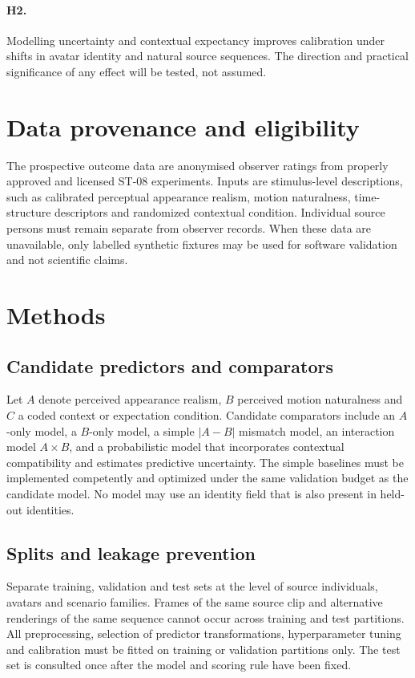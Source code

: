 \documentclass[11pt,a4paper]{article}
\begin{document}
\paragraph{H2.} Modelling uncertainty and contextual expectancy improves calibration under shifts in avatar identity and natural source sequences. The direction and practical significance of any effect will be tested, not assumed.
\section{Data provenance and eligibility}
The prospective outcome data are anonymised observer ratings from properly approved and licensed ST-08 experiments. Inputs are stimulus-level descriptions, such as calibrated perceptual appearance realism, motion naturalness, time-structure descriptors and randomized contextual condition. Individual source persons must remain separate from observer records. When these data are unavailable, only labelled synthetic fixtures may be used for software validation and not scientific claims.
\section{Methods}
\subsection{Candidate predictors and comparators}
Let $A$ denote perceived appearance realism, $B$ perceived motion naturalness and $C$ a coded context or expectation condition. Candidate comparators include an $A$-only model, a $B$-only model, a simple $|A-B|$ mismatch model, an interaction model $A\times B$, and a probabilistic model that incorporates contextual compatibility and estimates predictive uncertainty. The simple baselines must be implemented competently and optimized under the same validation budget as the candidate model. No model may use an identity field that is also present in held-out identities.
\subsection{Splits and leakage prevention}
Separate training, validation and test sets at the level of source individuals, avatars and scenario families. Frames of the same source clip and alternative renderings of the same sequence cannot occur across training and test partitions. All preprocessing, selection of predictor transformations, hyperparameter tuning and calibration must be fitted on training or validation partitions only. The test set is consulted once after the model and scoring rule have been fixed.
\end{document}
